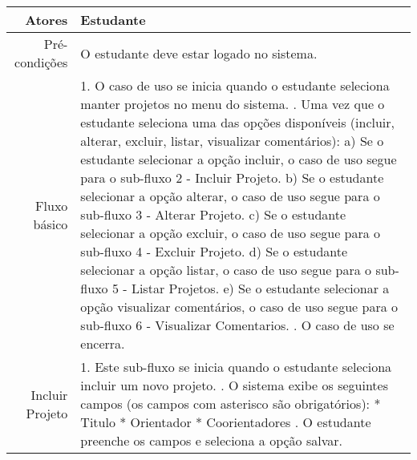 \begin{longtable}{r p{12cm}}
\hline
Atores & Estudante \\ \hline
Pré-condições & O estudante deve estar logado no sistema.\\
Fluxo básico &  1. O caso de uso se inicia quando o estudante seleciona manter projetos no menu do sistema. \newline
                2. Uma vez que o estudante seleciona uma das opções disponíveis (incluir, alterar, excluir, listar, visualizar comentários): \newline
                \hspace*{1cm} a) Se o estudante selecionar a opção incluir, o caso de uso segue para o sub-fluxo 2 - Incluir Projeto. \newline 
                \hspace*{1cm} b) Se o estudante selecionar a opção alterar, o caso de uso segue para o sub-fluxo 3 - Alterar Projeto.  \newline 
                \hspace*{1cm} c) Se o estudante selecionar a opção excluir, o caso de uso segue para o sub-fluxo 4 - Excluir Projeto.  \newline 
                \hspace*{1cm} d) Se o estudante selecionar a opção listar, o caso de uso segue para o sub-fluxo 5 - Listar Projetos.  \newline 
                \hspace*{1cm} e) Se o estudante selecionar a opção visualizar comentários, o caso de uso segue para o sub-fluxo 6 - Visualizar Comentarios.  \newline 
                3. O caso de uso se encerra. \newline \\
Incluir Projeto & 1. Este sub-fluxo se inicia quando o estudante seleciona incluir um novo projeto. \newline
                    2. O sistema exibe os seguintes campos (os campos com asterisco são obrigatórios): \newline
                    \hspace*{1cm} * Titulo \newline
                    \hspace*{1cm} * Orientador \newline
                    \hspace*{1cm} * Coorientadores \newline
                    3. O estudante preenche os campos e seleciona a opção salvar. \newline

\end{longtable}
